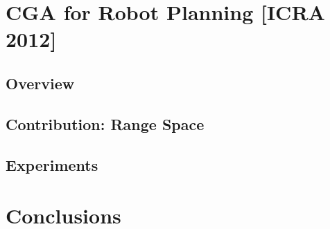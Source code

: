 \documentclass[10pt]{beamer}
\begin{document}






\section{CGA for Robot Planning [ICRA 2012]}
\subsection[Overview]{Overview}




%
%
%
%
%


\subsection[Range Space]{Contribution: Range Space}












\subsection[Experiments]{Experiments}

% 
% 
% 
% 
% 

%





\section{Conclusions}









\end{document}

